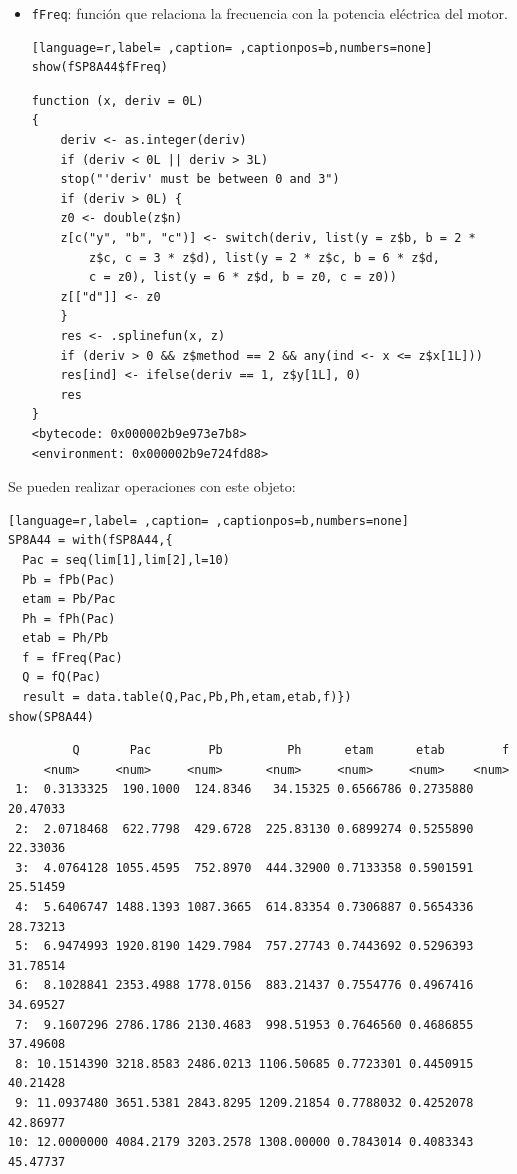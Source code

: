 \begin{itemize}
\begin{itemize}
\item \texttt{fFreq}: función que relaciona la frecuencia con la potencia eléctrica del motor.
\begin{lstlisting}[language=r,label= ,caption= ,captionpos=b,numbers=none]
show(fSP8A44$fFreq)
\end{lstlisting}

\begin{verbatim}
function (x, deriv = 0L) 
{
    deriv <- as.integer(deriv)
    if (deriv < 0L || deriv > 3L) 
	stop("'deriv' must be between 0 and 3")
    if (deriv > 0L) {
	z0 <- double(z$n)
	z[c("y", "b", "c")] <- switch(deriv, list(y = z$b, b = 2 * 
	    z$c, c = 3 * z$d), list(y = 2 * z$c, b = 6 * z$d, 
	    c = z0), list(y = 6 * z$d, b = z0, c = z0))
	z[["d"]] <- z0
    }
    res <- .splinefun(x, z)
    if (deriv > 0 && z$method == 2 && any(ind <- x <= z$x[1L])) 
	res[ind] <- ifelse(deriv == 1, z$y[1L], 0)
    res
}
<bytecode: 0x000002b9e973e7b8>
<environment: 0x000002b9e724fd88>
\end{verbatim}
\end{itemize}

Se pueden realizar operaciones con este objeto:
\begin{lstlisting}[language=r,label= ,caption= ,captionpos=b,numbers=none]
SP8A44 = with(fSP8A44,{
  Pac = seq(lim[1],lim[2],l=10)
  Pb = fPb(Pac)
  etam = Pb/Pac
  Ph = fPh(Pac)
  etab = Ph/Pb
  f = fFreq(Pac)
  Q = fQ(Pac)
  result = data.table(Q,Pac,Pb,Ph,etam,etab,f)})
show(SP8A44)
\end{lstlisting}

\begin{verbatim}
	     Q       Pac        Pb         Ph      etam      etab        f
	 <num>     <num>     <num>      <num>     <num>     <num>    <num>
 1:  0.3133325  190.1000  124.8346   34.15325 0.6566786 0.2735880 20.47033
 2:  2.0718468  622.7798  429.6728  225.83130 0.6899274 0.5255890 22.33036
 3:  4.0764128 1055.4595  752.8970  444.32900 0.7133358 0.5901591 25.51459
 4:  5.6406747 1488.1393 1087.3665  614.83354 0.7306887 0.5654336 28.73213
 5:  6.9474993 1920.8190 1429.7984  757.27743 0.7443692 0.5296393 31.78514
 6:  8.1028841 2353.4988 1778.0156  883.21437 0.7554776 0.4967416 34.69527
 7:  9.1607296 2786.1786 2130.4683  998.51953 0.7646560 0.4686855 37.49608
 8: 10.1514390 3218.8583 2486.0213 1106.50685 0.7723301 0.4450915 40.21428
 9: 11.0937480 3651.5381 2843.8295 1209.21854 0.7788032 0.4252078 42.86977
10: 12.0000000 4084.2179 3203.2578 1308.00000 0.7843014 0.4083343 45.47737
\end{verbatim}


\end{itemize}
